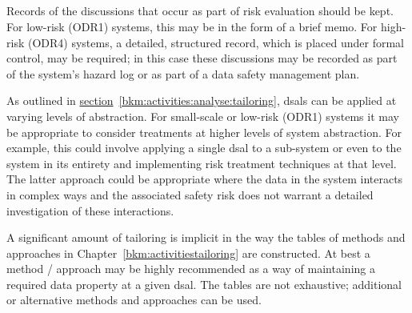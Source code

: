 \subsection{}
Records of the discussions that occur as part of risk evaluation should be kept. For low-risk (ODR1) systems, this may be in the form of a brief memo. For high-risk (ODR4) systems, a detailed, structured record, which is placed under formal control, may be required; in this case these discussions may be recorded as part of the system's \gls{hazard log} or as part of a data safety management plan.

As outlined in
\hyperref[bkm:activities:analyse:tailoring]{section}~\ref{bkm:activities:analyse:tailoring}, %
\glspl{dsal} can be applied at varying levels of abstraction. For small-scale or low-risk (ODR1) systems it may be appropriate to consider \glspl{treatment} at higher levels of system abstraction. For example, this could involve applying a single \gls{dsal} to a sub-system or even to the system in its entirety and implementing risk \gls{treatment} techniques at that level. The latter approach could be appropriate where the data in the system interacts in complex ways and the associated safety risk does not warrant a detailed investigation of these interactions.

A significant amount of \gls{tailoring} is implicit in the way the tables of methods and approaches in Chapter~\ref{bkm:activitiestailoring} are constructed. At best a method / approach may be highly recommended as a way of maintaining a required data property at a given \gls{dsal}. The tables are not exhaustive; additional or alternative methods and approaches can be used.
